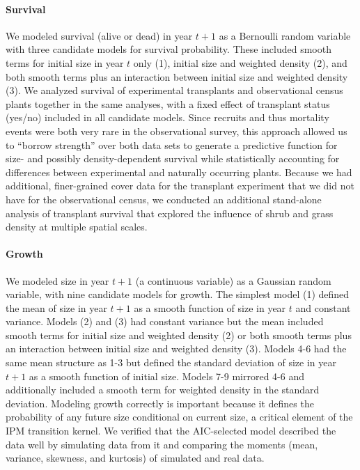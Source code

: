 \documentclass[11pt]{article}\usepackage[]{graphicx}\usepackage[usenames,dvipsnames]{xcolor}
\begin{document}
\paragraph{Survival}
We modeled survival (alive or dead) in year $t+1$ as a Bernoulli random variable with three candidate models for survival probability.
These included smooth terms for initial size in year $t$ only (1), initial size and weighted density (2), and both smooth terms plus an interaction between initial size and weighted density (3). 
We analyzed survival of experimental transplants and observational census plants together in the same analyses, with a fixed effect of transplant status (yes/no) included in all candidate models. 
Since recruits and thus mortality events were both very rare in the observational survey, this approach allowed us to ``borrow strength'' over both data sets to generate a predictive function for size- and possibly density-dependent survival while statistically accounting for differences between experimental and naturally occurring plants. 
Because we had additional, finer-grained cover data for the transplant experiment that we did not have for the observational census, we conducted an additional stand-alone analysis of transplant survival that explored the influence of shrub and grass density at multiple spatial scales.

\paragraph{Growth}
We modeled size in year $t+1$ (a continuous variable) as a Gaussian random variable, with nine candidate models for growth.
The simplest model (1) defined the mean of size in year $t+1$ as a smooth function of size in year $t$ and constant variance. 
Models (2) and (3) had constant variance but the mean included smooth terms for initial size and weighted density (2) or both smooth terms plus an interaction between initial size and weighted density (3).
Models 4-6 had the same mean structure as 1-3 but defined the standard deviation of size in year $t+1$ as a smooth function of initial size. 
Models 7-9 mirrored 4-6 and additionally included a smooth term for weighted density in the standard deviation. 
Modeling growth correctly is important because it defines the probability of any future size conditional on current size, a critical element of the IPM transition kernel.
We verified that the AIC-selected model described the data well by simulating data from it and comparing the moments (mean, variance, skewness, and kurtosis) of simulated and real data.
\end{document}
